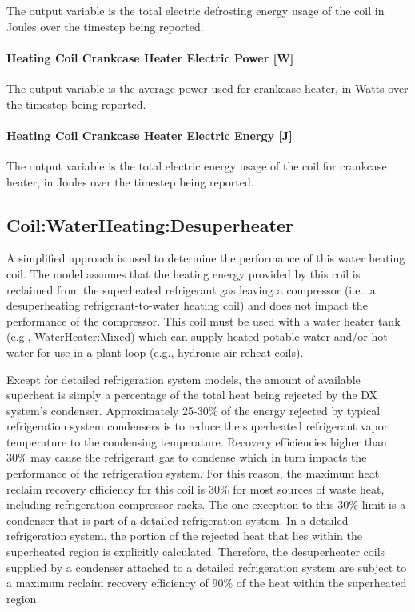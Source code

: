 The output variable is the total electric defrosting energy usage of the coil in Joules over the timestep being reported.

\paragraph{Heating Coil Crankcase Heater Electric Power {[}W{]}}\label{heating-coil-crankcase-heater-electric-power-w-2}

The output variable is the average power used for crankcase heater, in Watts over the timestep being reported.

\paragraph{Heating Coil Crankcase Heater Electric Energy {[}J{]}}\label{heating-coil-crankcase-heater-electric-energy-j-2}

The output variable is the total electric energy usage of the coil for crankcase heater, in Joules over the timestep being reported.

\subsection{Coil:WaterHeating:Desuperheater}\label{coilwaterheatingdesuperheater}

A simplified approach is used to determine the performance of this water heating coil. The model assumes that the heating energy provided by this coil is reclaimed from the superheated refrigerant gas leaving a compressor (i.e., a desuperheating refrigerant-to-water heating coil) and does not impact the performance of the compressor. This coil must be used with a water heater tank (e.g., WaterHeater:Mixed) which can supply heated potable water and/or hot water for use in a plant loop (e.g., hydronic air reheat coils).

Except for detailed refrigeration system models, the amount of available superheat is simply a percentage of the total heat being rejected by the DX system's condenser. Approximately 25-30\% of the energy rejected by typical refrigeration system condensers is to reduce the superheated refrigerant vapor temperature to the condensing temperature. Recovery efficiencies higher than 30\% may cause the refrigerant gas to condense which in turn impacts the performance of the refrigeration system. For this reason, the maximum heat reclaim recovery efficiency for this coil is 30\% for most sources of waste heat, including refrigeration compressor racks. The one exception to this 30\% limit is a condenser that is part of a detailed refrigeration system. In a detailed refrigeration system, the portion of the rejected heat that lies within the superheated region is explicitly calculated. Therefore, the desuperheater coils supplied by a condenser attached to a detailed refrigeration system are subject to a maximum reclaim recovery efficiency of 90\% of the heat within the superheated region.

